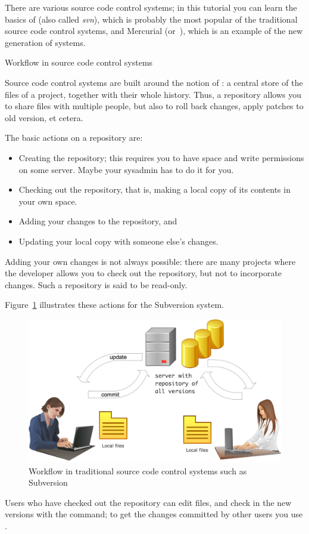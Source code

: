 There are various source code control systems; in this tutorial you
can learn the basics of  (also called
\emph{svn}), which is probably the most popular of the traditional
source code control systems, and Mercurial (or~), which is an
example of the new generation of  systems.

 {Workflow in source code control systems}

Source code control systems are built around the notion
of : a central store of the files of a project,
together with their whole history. Thus, a repository allows you to
share files with multiple people, but also to roll back changes, apply
patches to old version, et cetera.

The basic actions on a repository are:
\begin{itemize}
\item Creating the repository; this requires you to have space and
  write permissions on some server. Maybe your sysadmin has to do it
  for you.
\item Checking out the repository, that is, making a local copy of its
  contents in your own space.
\item\label{it:commit} Adding your changes to the repository, and
\item Updating your local copy with someone else's changes.
\end{itemize}
Adding your own changes is not always possible: there are many projects
where the developer allows you to check out the repository, but not to
incorporate changes. Such a repository is said to be read-only.

Figure~\ref{fig:svn} illustrates these actions for the Subversion system.
\begin{figure}[ht]
\includegraphics[scale=.17]{graphics/repo-flow-svn}
\caption{Workflow in traditional source code control systems such as Subversion}
\label{fig:svn}
\end{figure}
Users who have checked out the repository can edit files, and check in
the new versions with the  command; to get the changes
committed by other users you use .

